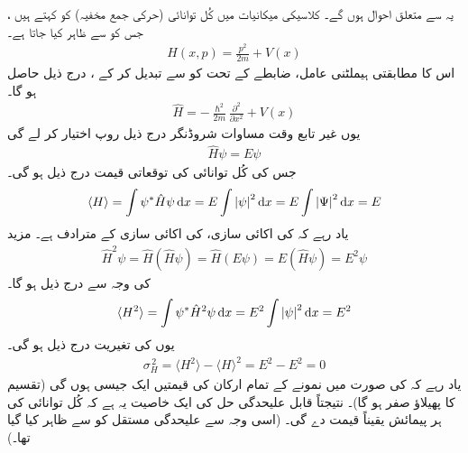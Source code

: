  \quad
یہ  سے متعلق احوال ہوں گے۔ کلاسیکی میکانیات میں کُل توانائی (حرکی جمع مخفیہ) کو  کہتے ہیں ، جس کو  سے ظاہر کیا جاتا ہے۔ 
\begin{align}
H(x,p) = \frac{p^{2}}{2m} + V(x)
\end{align}
اس کا مطابقتی ہیملٹنی عامل، ضابطے کے تحت  کو  سے تبدیل 
کر کے ، درج ذیل  حاصل ہو گا۔ 
\begin{align}
\hat{H} = - \frac{\hslash^{2}}{2m} \frac{\partial^{2}}{\partial x^{2}} + V(x) 
\end{align}
یوں غیر تابع وقت مساوات شروڈنگر  درج ذیل روپ اختیار کر لے   گی 
\begin{align}\label{مساوات_غیر_تابع_شروڈنگر_توانائی_مساوات}
\hat{H} \psi = E\psi
\end{align}
جس کی کُل توانائی کی توقعاتی قیمت درج ذیل ہو گی۔ 
\begin{align}
\langle H \rangle = \int \psi^{*} \hat{H}\psi \dif x = E \int \left| \psi \right|^{2} \dif x = E \int \left| \Psi \right|^{2} \dif x = E
\end{align}
یاد رہے کہ  کی اکائی سازی،  کی اکائی سازی کے مترادف ہے۔ مزید
\begin{align*}
\hat{H}^{2} \psi = \hat{H} (\hat{H}\psi ) = \hat{H} ( E\psi ) = E (\hat{H} \psi ) = E^{2} \psi 
\end{align*}
کی وجہ سے درج ذیل ہو گا۔
\begin{align*}
\langle H^{2} \rangle = \int \psi^{*} \hat{H}^{2} \psi \dif x = E^{2} \int \left| \psi \right|^{2} \dif x = E^{2}
\end{align*}
یوں   کی تغیریت درج ذیل ہو گی۔ 
\begin{align}
\sigma^{\,2}_{H} = \langle H^{2} \rangle - \langle H \rangle^{2} =E^{2} - E^{2} = 0
\end{align}
یاد رہے کہ  کی صورت میں نمونے  کے تمام ارکان کی قیمتیں ایک جیسی ہوں گی (تقسیم کا پھیلاؤ صفر ہو گا)۔ نتیجتاً قابل علیحدگی حل کی ایک خاصیت یہ ہے کہ کُل توانائی کی ہر پیمائش یقیناً قیمت  دے گی۔ (اسی وجہ سے   علیحدگی مستقل کو  سے ظاہر کیا گیا  تھا۔) 

